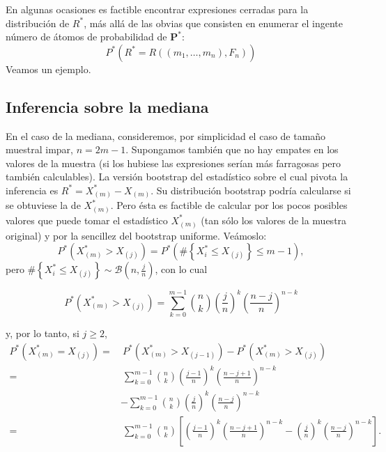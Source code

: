 \documentclass[]{book}
\theoremstyle{definition}
\theoremstyle{definition}
\theoremstyle{definition}
\theoremstyle{remark}
\begin{document}
En algunas ocasiones es factible encontrar expresiones cerradas para la
distribución de \(R^{\ast}\), más allá de las obvias que consisten en
enumerar el ingente número de átomos de probabilidad de
\(\mathbf{P}^{\ast}\):
\[P^{\ast}\left( R^{\ast}=R\left( \left( m_1,\ldots ,m_n \right)
,F_n \right) \right)\] Veamos un ejemplo.

\subsection{Inferencia sobre la
mediana}\label{inferencia-sobre-la-mediana}

En el caso de la mediana, consideremos, por simplicidad el caso de
tamaño muestral impar, \(n=2m-1\). Supongamos también que no hay empates
en los valores de la muestra (si los hubiese las expresiones serían más
farragosas pero también calculables). La versión bootstrap del
estadístico sobre el cual pivota la inferencia es
\(R^{\ast}=X_{\left( m \right)}^{\ast}-X_{(m)}\). Su distribución
bootstrap podría calcularse si se obtuviese la de \(X_{(m)}^{\ast}\).
Pero ésta es factible de calcular por los pocos posibles valores que
puede tomar el estadístico \(X_{(m)}^{\ast}\) (tan sólo los valores de
la muestra original) y por la sencillez del bootstrap uniforme.
Veámoslo: \[P^{\ast}\left( X_{(m)}^{\ast}>X_{(j)} \right)
=P^{\ast}\left( \#\left\{ X_i^{\ast}\leq X_{(j)}\right\}
\leq m-1 \right),\] pero
\(\#\left\{ X_i^{\ast}\leq X_{(j)}\right\} \sim \mathcal{B}\left( n,\frac{j}{n} \right)\),
con lo cual

\[P^{\ast}\left( X_{(m)}^{\ast}>X_{(j)} \right)
=\sum_{k=0}^{m-1}\binom{n}{k}\left( \frac{j}{n} \right)^{k}
\left( \frac{n-j}{n} \right)^{n-k}\]

y, por lo tanto, si \(j\geq 2\), \[\begin{aligned}
P^{\ast}\left( X_{(m)}^{\ast}=X_{(j)} \right)
=&\ P^{\ast}\left( X_{(m)}^{\ast}>X_{\left( j-1 \right)} \right)
-P^{\ast}\left( X_{(m)}^{\ast}>X_{(j)} \right) \\
=&\ \sum_{k=0}^{m-1}\binom{n}{k}\left( \frac{j-1}{n} \right)^{k}\left( \frac{
n-j+1}{n} \right)^{n-k} \\
&-\sum_{k=0}^{m-1}\binom{n}{k}\left( \frac{j}{n} \right)^{k}\left( \frac{n-j}{
n} \right)^{n-k} \\
=&\ \sum_{k=0}^{m-1}\binom{n}{k}\left[ \left( \frac{j-1}{n} \right)^{k}\left( 
\frac{n-j+1}{n} \right)^{n-k}-\left( \frac{j}{n} \right)^{k}\left( \frac{n-j
}{n} \right)^{n-k}\right] .
\end{aligned}\]
\end{document}
